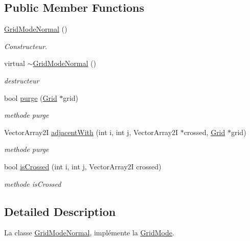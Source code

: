 \subsection*{Public Member Functions}
\begin{DoxyCompactItemize}
\item 
\hyperlink{classGridModeNormal_a1e0d7a4d499cc8bcecb32db771f722c1}{Grid\-Mode\-Normal} ()
\begin{DoxyCompactList}\small\item\em Constructeur. \end{DoxyCompactList}\item 
virtual \hyperlink{classGridModeNormal_a639e48cf51310fa3a39f0ff5a954d5a2}{$\sim$\-Grid\-Mode\-Normal} ()
\begin{DoxyCompactList}\small\item\em destructeur \end{DoxyCompactList}\item 
\hypertarget{classGridModeNormal_a4bcb4bcd60e82c65d2d6c8909b38e5fa}{bool \hyperlink{classGridModeNormal_a4bcb4bcd60e82c65d2d6c8909b38e5fa}{purge} (\hyperlink{classGrid}{Grid} $\ast$grid)}\label{classGridModeNormal_a4bcb4bcd60e82c65d2d6c8909b38e5fa}

\begin{DoxyCompactList}\small\item\em methode purge \end{DoxyCompactList}\item 
Vector\-Array2\-I \hyperlink{classGridModeNormal_a3949d24da71761d187217282f8c1f2e8}{adjacent\-With} (int i, int j, Vector\-Array2\-I $\ast$crossed, \hyperlink{classGrid}{Grid} $\ast$grid)
\begin{DoxyCompactList}\small\item\em methode purge \end{DoxyCompactList}\item 
bool \hyperlink{classGridModeNormal_ab58ed641dd0a89f6eb2976e8e638a8d8}{is\-Crossed} (int i, int j, Vector\-Array2\-I crossed)
\begin{DoxyCompactList}\small\item\em methode is\-Crossed \end{DoxyCompactList}\end{DoxyCompactItemize}


\subsection{Detailed Description}
La classe \hyperlink{classGridModeNormal}{Grid\-Mode\-Normal}, implémente la \hyperlink{classGridMode}{Grid\-Mode}. 

